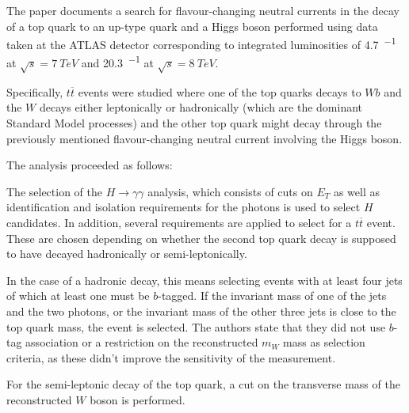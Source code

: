 

\noindent
The paper\cite{aad} documents a search for flavour-changing neutral currents in the decay of a top quark to an up-type quark and a Higgs boson performed using data taken at the ATLAS detector corresponding to integrated luminosities of \SI{4.7}{^{-1}} at $\sqrt{s} = \SI{7}{TeV}$ and \SI{20.3}{^{-1}} at $\sqrt{s} = \SI{8}{TeV}$.

Specifically, $t\overline{t}$ events were studied where one of the top quarks decays to $Wb$ and the $W$ decays either leptonically or hadronically (which are the dominant Standard Model processes) and the other top quark might decay through the previously mentioned flavour-changing neutral current involving the Higgs boson.

The analysis proceeded as follows:

The selection of the $H\to\gamma \gamma$ analysis, which consists of cuts on $E_T$ as well as identification and isolation requirements for the photons is used to select $H$ candidates.
In addition, several requirements are applied to select for a $t\overline{t}$ event.
These are chosen depending on whether the second top quark decay is supposed to have decayed hadronically or semi-leptonically.

In the case of a hadronic decay, this means selecting events with at least four jets of which at least one must be $b$-tagged.
If the invariant mass of one of the jets and the two photons, or the invariant mass of the other three jets is close to the top quark mass, the event is selected.
The authors state that they did not use $b$-tag association or a restriction on the reconstructed $m_W$ mass as selection criteria, as these didn't improve the sensitivity of the measurement.

For the semi-leptonic decay of the top quark, a cut on the transverse mass of the reconstructed $W$ boson is performed.

